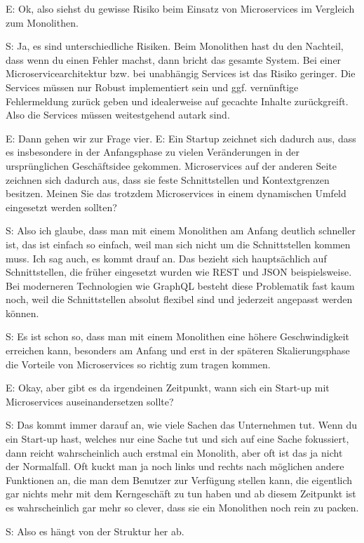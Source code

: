 E: Ok, also siehst du gewisse Risiko beim Einsatz von Microservices im Vergleich zum Monolithen. 

S: Ja, es sind unterschiedliche Risiken. Beim Monolithen hast du den Nachteil, dass wenn du einen Fehler machst, dann bricht das gesamte System. Bei einer Microservicearchitektur bzw. bei unabhängig Services ist das Risiko geringer. Die Services müssen nur Robust implementiert sein und ggf. vernünftige Fehlermeldung zurück geben und idealerweise auf gecachte Inhalte zurückgreift. Also die Services müssen weitestgehend autark sind.

E: Dann gehen wir zur Frage vier.
E: Ein Startup zeichnet sich dadurch aus, dass es insbesondere in der Anfangsphase zu vielen Veränderungen in der ursprünglichen Geschäftsidee gekommen. Microservices auf der anderen Seite zeichnen sich dadurch aus, dass sie feste Schnittstellen und Kontextgrenzen besitzen. Meinen Sie das trotzdem Microservices in einem dynamischen Umfeld eingesetzt werden sollten?

S: Also ich glaube, dass man mit einem Monolithen am Anfang deutlich schneller ist, das ist einfach so einfach, weil man sich nicht um die Schnittstellen kommen muss. Ich sag auch, es kommt drauf an. Das bezieht sich hauptsächlich auf Schnittstellen, die früher eingesetzt wurden wie REST und JSON beispielsweise. Bei moderneren Technologien wie GraphQL besteht diese Problematik fast kaum noch, weil die Schnittstellen absolut flexibel sind und jederzeit angepasst werden können.

S: Es ist schon so, dass man mit einem Monolithen eine höhere Geschwindigkeit erreichen kann, besonders am Anfang und erst in der späteren Skalierungsphase die Vorteile von Microservices so richtig zum tragen kommen.

E: Okay, aber gibt es da irgendeinen Zeitpunkt, wann sich ein Start-up mit Microservices auseinandersetzen sollte?

S: Das kommt immer darauf an, wie viele Sachen das Unternehmen tut. Wenn du ein Start-up hast, welches nur eine Sache tut und sich auf eine Sache fokussiert, dann reicht wahrscheinlich auch erstmal ein Monolith, aber oft ist das ja nicht der Normalfall. Oft kuckt man ja noch links und rechts nach möglichen andere Funktionen an, die man dem Benutzer zur Verfügung stellen kann, die eigentlich gar nichts mehr mit dem Kerngeschäft zu tun haben und ab diesem Zeitpunkt ist es wahrscheinlich gar mehr so clever, dass sie ein Monolithen noch rein zu packen. 

S: Also es hängt von der Struktur her ab.

